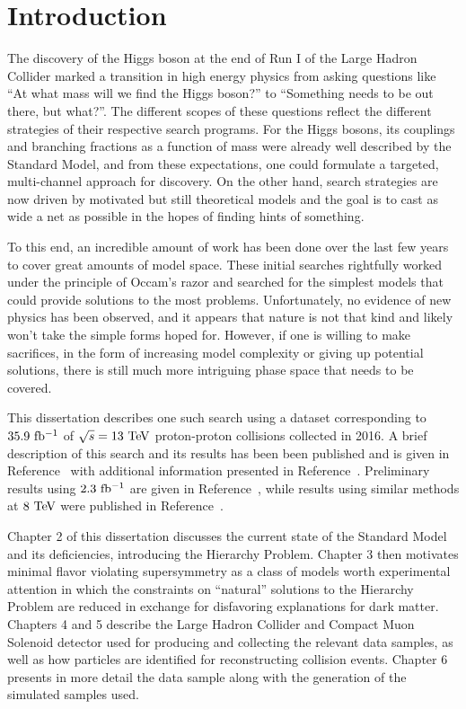 \chapter{Introduction}

The discovery of the Higgs boson at the end of Run I of the Large Hadron Collider marked a transition in high energy physics from asking questions like ``At what mass will we find the Higgs boson?'' to ``Something needs to be out there, but what?''.
The different scopes of these questions reflect the different strategies of their respective search programs.
For the Higgs bosons, its couplings and branching fractions as a function of mass were already well described by the Standard Model, and from these expectations, one could formulate a targeted, multi-channel approach for discovery.
On the other hand, search strategies are now driven by motivated but still theoretical models and the goal is to cast as wide a net as possible in the hopes of finding hints of something.

To this end, an incredible amount of work has been done over the last few years to cover great amounts of model space.
These initial searches rightfully worked under the principle of Occam's razor and searched for the simplest models that could provide solutions to the most problems.
Unfortunately, no evidence of new physics has been observed, and it appears that nature is not that kind and likely won't take the simple forms hoped for.
However, if one is willing to make sacrifices, in the form of increasing model complexity or giving up potential solutions, there is still much more intriguing phase space that needs to be covered. 

This dissertation describes one such search using a dataset corresponding to $35.9~\mathrm{fb^{-1}}$ of $\sqrt{s} = 13~\mathrm{Te\kern -0.1em V}$ proton-proton collisions collected in 2016. 
A brief description of this search and its results has been been published and is given in Reference~\cite{Sirunyan:2017dhe} with additional information presented in Reference~\cite{SUS-16-040_supp}.
Preliminary results using $2.3~\mathrm{fb^{-1}}$ are given in Reference~\cite{CMS-PAS-SUS-16-013}, while results using similar methods at $8~\mathrm{Te\kern -0.1em V}$ were published in Reference~\cite{Khachatryan:2016iqn}.

Chapter 2 of this dissertation discusses the current state of the Standard Model and its deficiencies, introducing the Hierarchy Problem.
Chapter 3 then motivates minimal flavor violating supersymmetry as a class of models worth experimental attention in which the constraints on ``natural'' solutions to the Hierarchy Problem are reduced in exchange for disfavoring explanations for dark matter.
Chapters 4 and 5 describe the Large Hadron Collider and Compact Muon Solenoid detector used for producing and collecting the relevant data samples, as well as how particles are identified for reconstructing collision events.
Chapter 6 presents in more detail the data sample along with the generation of the simulated samples used.

